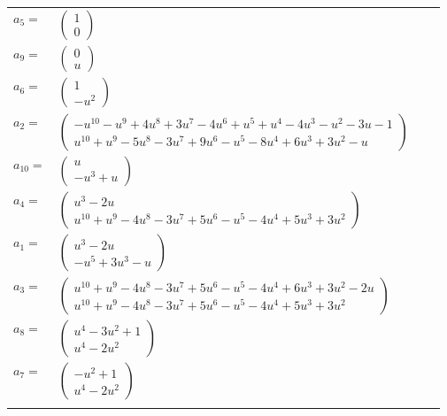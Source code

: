 \documentclass[1p]{elsarticle_modified}
\theoremstyle{definition}
\begin{document}
\begin{tabular}{m{7pt} m{180pt} m{7pt} m{180pt} }
\flushright $a_{5}=$&$\begin{pmatrix}1\\0\end{pmatrix}$ \\
\flushright $a_{9}=$&$\begin{pmatrix}0\\u\end{pmatrix}$ \\
\flushright $a_{6}=$&$\begin{pmatrix}1\\- u^2\end{pmatrix}$ \\
\flushright $a_{2}=$&$\begin{pmatrix}- u^{10}- u^9+4 u^8+3 u^7-4 u^6+u^5+u^4-4 u^3- u^2-3 u-1\\u^{10}+u^9-5 u^8-3 u^7+9 u^6- u^5-8 u^4+6 u^3+3 u^2- u\end{pmatrix}$ \\
\flushright $a_{10}=$&$\begin{pmatrix}u\\- u^3+u\end{pmatrix}$ \\
\flushright $a_{4}=$&$\begin{pmatrix}u^3-2 u\\u^{10}+u^9-4 u^8-3 u^7+5 u^6- u^5-4 u^4+5 u^3+3 u^2\end{pmatrix}$ \\
\flushright $a_{1}=$&$\begin{pmatrix}u^3-2 u\\- u^5+3 u^3- u\end{pmatrix}$ \\
\flushright $a_{3}=$&$\begin{pmatrix}u^{10}+u^9-4 u^8-3 u^7+5 u^6- u^5-4 u^4+6 u^3+3 u^2-2 u\\u^{10}+u^9-4 u^8-3 u^7+5 u^6- u^5-4 u^4+5 u^3+3 u^2\end{pmatrix}$ \\
\flushright $a_{8}=$&$\begin{pmatrix}u^4-3 u^2+1\\u^4-2 u^2\end{pmatrix}$ \\
\flushright $a_{7}=$&$\begin{pmatrix}- u^2+1\\u^4-2 u^2\end{pmatrix}$\\&\end{tabular}
\end{document}
